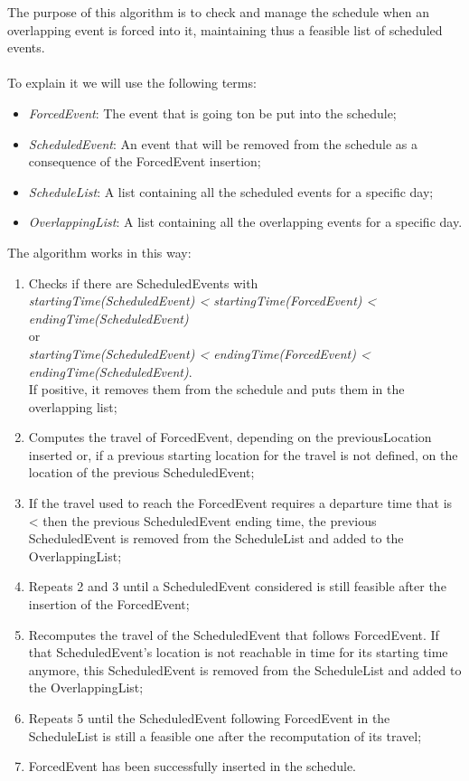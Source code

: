 The purpose of this algorithm is to check and manage the schedule when an overlapping event is forced into it, maintaining thus a feasible list of scheduled events. \\ \\
To explain it we will use the following terms: 
\begin{itemize}
	\item \textit{ForcedEvent}: The event that is going ton be put into the schedule;
	\item \textit{ScheduledEvent}: An event that will be removed from the schedule as a consequence of the ForcedEvent insertion;
	\item \textit{ScheduleList}: A list containing all the scheduled events for a specific day;
	\item \textit{OverlappingList}: A list containing all the overlapping events for a specific day.
\end{itemize}

\noindent The algorithm works in this way:
\begin{enumerate}
	\item Checks if there are ScheduledEvents with \\ \textit{startingTime(ScheduledEvent) < startingTime(ForcedEvent) < endingTime(ScheduledEvent)} \\ or \\ \textit{startingTime(ScheduledEvent) < endingTime(ForcedEvent) < endingTime(ScheduledEvent)}. \\
	If positive, it removes them from the schedule and puts them in the overlapping list;
	\item Computes the travel of ForcedEvent, depending on the previousLocation inserted or, if a previous starting location for the travel is not defined, on the location of the previous ScheduledEvent;
	\item If the travel used to reach the ForcedEvent requires a departure time that is < then the previous ScheduledEvent ending time, the previous ScheduledEvent is removed from the ScheduleList and added to the OverlappingList;
	\item Repeats 2 and 3 until a ScheduledEvent considered is still feasible after the insertion of the ForcedEvent;
	\item Recomputes the travel of the ScheduledEvent that follows ForcedEvent. If that ScheduledEvent's location is not reachable in time for its starting time anymore, this ScheduledEvent is removed from the ScheduleList and added to the OverlappingList;
	\item Repeats 5 until the ScheduledEvent following ForcedEvent in the ScheduleList is still a feasible one after the recomputation of its travel;
	\item ForcedEvent has been successfully inserted in the schedule.
\end{enumerate}